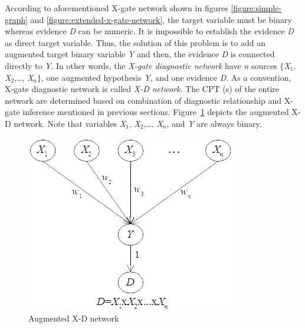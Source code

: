\documentclass{article}
\numberwithin{equation}{section}
\numberwithin{figure}{section}
\numberwithin{table}{section}
\begin{document}
According to aforementioned X-gate network shown in figures \ref{figure:simple-graph} and \ref{figure:extended-x-gate-network}, the target variable must be binary whereas evidence \textit{D} can be numeric. It is impossible to establish the evidence \textit{D} as direct target variable. Thus, the solution of this problem is to add an augmented target binary variable \textit{Y} and then, the evidence \textit{D} is connected directly to \textit{Y}. In other words, the \textit{X-gate diagnostic network} have \textit{n} sources $\{$\textit{X}${}_{1}$, \textit{X}${}_{2}$,{\dots}, \textit{X${}_{n}$}$\}$, one augmented hypothesis \textit{Y}, and one evidence \textit{D}. As a convention, X-gate diagnostic network is called \textit{X-D network}. The CPT (s) of the entire network are determined based on combination of diagnostic relationship and X-gate inference mentioned in previous sections. Figure~\ref{figure:augmented-xd-network} depicts the augmented X-D network. Note that variables \textit{X}${}_{1}$, \textit{X}${}_{2}$,{\dots}, \textit{X${}_{n}$}, and \textit{Y} are always binary.

\begin{figure}
\centering
\includegraphics{XDNetwork.png}
\caption{Augmented X-D network}
\label{figure:augmented-xd-network}
\end{figure}
\end{document}
